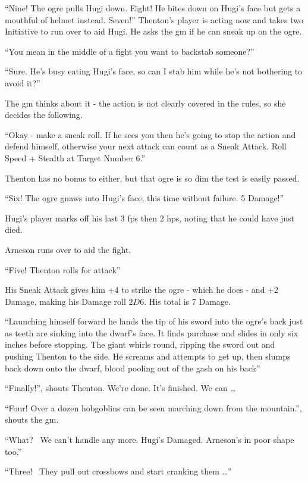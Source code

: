 \begin{multicols}{2}
{\begin{exampletext}
		``Nine! The ogre pulls Hugi down. Eight! He bites down on Hugi's face but gets a mouthful of helmet instead. Seven!''
		Thenton's player is acting now and takes two Initiative to run over to aid Hugi. He asks the \gls{gm} if he can sneak up on the ogre.

		``You mean in the middle of a fight you want to backstab someone?''

		``Sure. He's busy eating Hugi's face, so can I stab him while he's not bothering to avoid it?''

		The \gls{gm} thinks about it - the action is not clearly covered in the rules, so she decides the following.

		``Okay - make a sneak roll. If he sees you then he's going to stop the action and defend himself, otherwise your next attack can count as a Sneak Attack. Roll Speed + Stealth at Target Number 6.''

		Thenton has no bonus to either, but that ogre is so dim the test is easily passed. 

		``Six! The ogre gnaws into Hugi's face, this time without failure. 5 Damage!''

		Hugi's player marks off his last 3 \glspl{fp} then 2 \glspl{hp}, noting that he could have just died.

		Arneson runs over to aid the fight.

``Five! Thenton rolls for attack''

His Sneak Attack gives him +4 to strike the ogre - which he does - and +2 Damage, making his Damage roll $2D6$. His total is 7 Damage.

		``Launching himself forward he lands the tip of his sword into the ogre's back just as teeth are sinking into the dwarf's face. It finds purchase and slides in only six inches before stopping. The giant whirls \gls{round}, ripping the sword out and pushing Thenton to the side. He screams and attempts to get up, then slumps back down onto the dwarf, blood pooling out of the gash on his back''

``Finally!'', shouts Thenton. We're done. It's finished. We can {\dots}

``Four! Over a dozen hobgoblins can be seen marching down from the mountain.'', shouts the \gls{gm}.

``What? \ We can't handle any more. Hugi's Damaged. Arneson's in poor shape too.''

``Three! \ They pull out crossbows and start cranking them {\dots}''
	\end{exampletext}}{}

\end{multicols}

